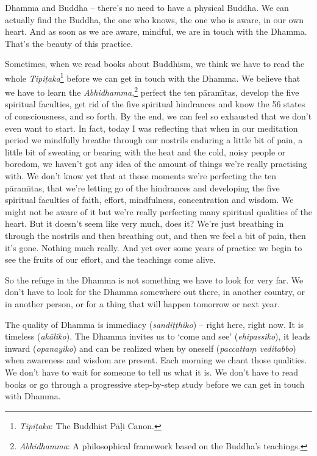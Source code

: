 Dhamma and Buddha -- there's no need to have a physical Buddha. We can actually find the Buddha, the one who knows, the one who is aware, in our own heart. And as soon as we are aware, mindful, we are in touch with the Dhamma. That's the beauty of this practice.

Sometimes, when we read books about Buddhism, we think we have to read the whole \textit{Tipi\d{t}aka}\footnote{\textit{Tipi\d{t}aka}: The Buddhist P\=a\d{l}i Canon.} before we can get in touch with the Dhamma. We believe that we have to learn the \textit{Abhidhamma},\footnote{\textit{Abhidhamma}: A philosophical framework based on the Buddha's teachings.} perfect the ten p\=aram\={\i}tas, develop the five spiritual faculties, get rid of the five spiritual hindrances and know the 56 states of consciousness, and so forth. By the end, we can feel so exhausted that we don't even want to start. In fact, today I was reflecting that when in our meditation period we mindfully breathe through our nostrils enduring a little bit of pain, a little bit of sweating or bearing with the heat and the cold, noisy people or boredom, we haven't got any idea of the amount of things we're really practising with. We don't know yet that at those moments we're perfecting the ten p\=aram\={\i}tas, that we're letting go of the hindrances and developing the five spiritual faculties of faith, effort, mindfulness, concentration and wisdom. We might not be aware of it but we're really perfecting many spiritual qualities of the heart. But it doesn't seem like very much, does it? We're just breathing in through the nostrils and then breathing out, and then we feel a bit of pain, then it's gone. Nothing much really. And yet over some years of practice we begin to see the fruits of our effort, and the teachings come alive.

So the refuge in the Dhamma is not something we have to look for very far. We don't have to look for the Dhamma somewhere out there, in another country, or in another person, or for a thing that will happen tomorrow or next year.

The quality of Dhamma is immediacy (\textit{sandi\d{t}\d{t}hiko}) -- right here, right now.  It is timeless (\textit{ak\=aliko}). The Dhamma invites us to `come and see' (\textit{ehipassiko}), it leads inward (\textit{opanayiko}) and can be realized when by oneself (\textit{paccatta\d{m} veditabbo}) when awareness and wisdom are present. Each morning we chant those qualities. We don't have to wait for someone to tell us what it is. We don't have to read books or go through a progressive step-by-step study before we can get in touch with Dhamma.

